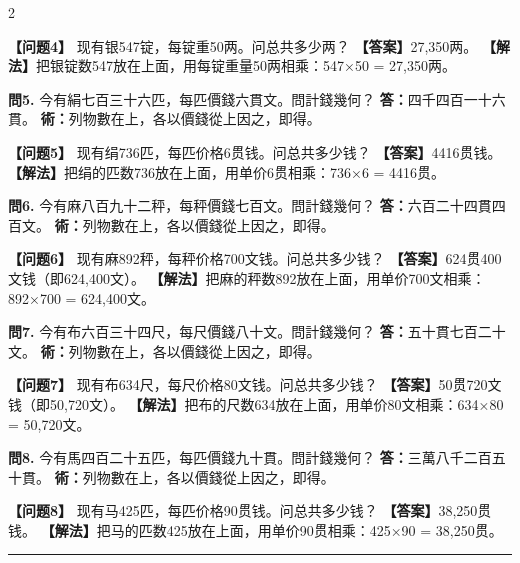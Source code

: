 \documentclass[11pt,a4paper]{article}
\newcommand{\longline}{\noindent\rule{\textwidth}{0.4pt}}
\begin{document}
\begin{paracol}{2}
\switchcolumn

\textbf{【问题4】} 现有银547锭，每锭重50两。问总共多少两？\break
\textbf{【答案】}27,350两。\break
\textbf{【解法】}把银锭数547放在上面，用每锭重量50两相乘：547×50 = 27,350两。

\switchcolumn*

\textbf{問5.} 今有絹七百三十六匹，每匹價錢六貫文。問計錢幾何？\break
\textbf{答：}四千四百一十六貫。\break
\textbf{術：}列物數在上，各以價錢從上因之，即得。

\switchcolumn

\textbf{【问题5】} 现有绢736匹，每匹价格6贯钱。问总共多少钱？\break
\textbf{【答案】}4416贯钱。\break
\textbf{【解法】}把绢的匹数736放在上面，用单价6贯相乘：736×6 = 4416贯。

\switchcolumn*

\textbf{問6.} 今有麻八百九十二秤，每秤價錢七百文。問計錢幾何？\break
\textbf{答：}六百二十四貫四百文。\break
\textbf{術：}列物數在上，各以價錢從上因之，即得。

\switchcolumn

\textbf{【问题6】} 现有麻892秤，每秤价格700文钱。问总共多少钱？\break
\textbf{【答案】}624贯400文钱（即624,400文）。\break
\textbf{【解法】}把麻的秤数892放在上面，用单价700文相乘：892×700 = 624,400文。

\switchcolumn*

\textbf{問7.} 今有布六百三十四尺，每尺價錢八十文。問計錢幾何？\break
\textbf{答：}五十貫七百二十文。\break
\textbf{術：}列物數在上，各以價錢從上因之，即得。

\switchcolumn

\textbf{【问题7】} 现有布634尺，每尺价格80文钱。问总共多少钱？\break
\textbf{【答案】}50贯720文钱（即50,720文）。\break
\textbf{【解法】}把布的尺数634放在上面，用单价80文相乘：634×80 = 50,720文。

\switchcolumn*

\textbf{問8.} 今有馬四百二十五匹，每匹價錢九十貫。問計錢幾何？\break
\textbf{答：}三萬八千二百五十貫。\break
\textbf{術：}列物數在上，各以價錢從上因之，即得。

\switchcolumn

\textbf{【问题8】} 现有马425匹，每匹价格90贯钱。问总共多少钱？\break
\textbf{【答案】}38,250贯钱。\break
\textbf{【解法】}把马的匹数425放在上面，用单价90贯相乘：425×90 = 38,250贯。

\end{paracol}

\longline

\end{document}
